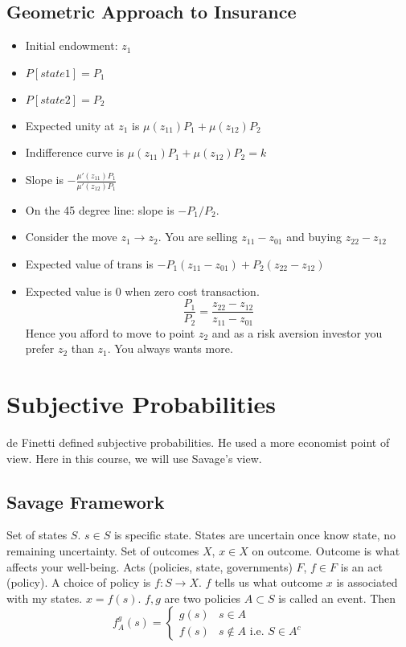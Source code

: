 \documentclass[11pt, a4paper, oneside]{article}
\theoremstyle{definition}
\theoremstyle{proposition}
\theoremstyle{corollary}
\theoremstyle{lemma}
\theoremstyle{theorem}
\begin{document}
\subsection{Geometric Approach to Insurance}
\begin{itemize}
\item Initial endowment: $z_1$
\item $P[state1] = P_1$
\item $P[state2] = P_2$
\item Expected unity at $z_1$ is $\mu(z_{11})P_1 + \mu(z_{12}) P_2$
\item Indifference curve is $\mu(z_{11})P_1 + \mu(z_{12}) P_2=k$
\item Slope is $-\frac{\mu'(z_{11})P_1}{\mu'(z_{12})P_1}$
\item On the 45 degree line: slope is $-P_1/P_2$. 
\item Consider the move $z_1 \to z_2$. You are selling $z_{11} - z_{01}$ and buying $z_{22} - z_{12}$
\item Expected value of trans is $-P_1(z_{11}- z_{01}) + P_2(z_{22} - z_{12})$
\item Expected value is 0 when zero cost transaction.
$$\frac{P_1}{P_2} = \frac{z_{22} - z_{12}}{z_{11}- z_{01}} $$
Hence you afford to move to point $z_2$ and as a risk aversion investor you prefer $z_2$ than $z_1$. You always wants more. 
\end{itemize}

\section{Subjective Probabilities}
de Finetti defined subjective probabilities. He used a more economist point of view. Here in this course, we will use Savage's view. 

\subsection{Savage Framework}
Set of states $S$. $s\in S$ is specific state. States are uncertain once know state, no remaining uncertainty. Set of outcomes $X$, $x\in X$ on outcome. Outcome is what affects your well-being. Acts (policies, state, governments) $F$, $f\in F$ is an act (policy). A choice of policy is $f: S \to X$. $f$ tells us what outcome $x$ is associated with my states. $x = f(s)$. $f, g $ are two policies $A\subset S$ is called an event. Then
$$f_A^g(s) = \begin{cases}
g(s) & s \in A\\
f(s) & s \notin A\text{ i.e. } S \in A^c
\end{cases}$$
\end{document}
